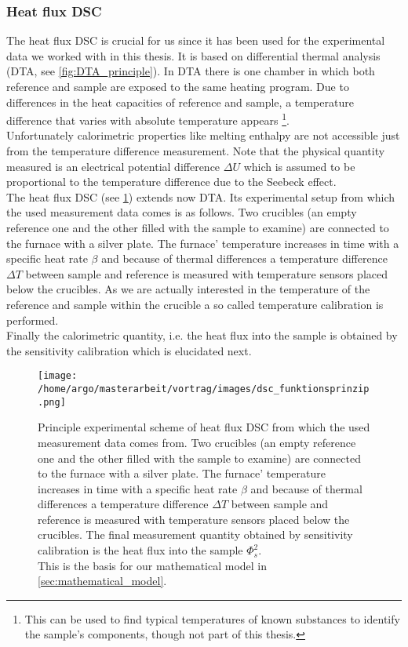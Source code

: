 \documentclass{scrartcl}[12pt, halfparskip]
\numberwithin{equation}{section}
\numberwithin{figure}{section}
\numberwithin{table}{section}
\begin{document}
\subsubsection{Heat flux DSC}
\label{sec:heat_flux_dsc}
The heat flux DSC is crucial for us since it has been used for the experimental data we worked with in this thesis. It is based on differential thermal analysis (DTA, see \cref{fig:DTA_principle}). 
In DTA there is one chamber in which both reference and sample are exposed to the same heating program.
Due to differences in the heat capacities of reference and sample, a temperature difference that varies with absolute temperature appears \footnote{This can be used to find typical temperatures of known substances to identify the sample's components, though not part of this thesis.}. \\
Unfortunately calorimetric properties like melting enthalpy are not accessible just from the temperature difference measurement. 
Note that the physical quantity measured is an electrical potential difference $\Delta U$ which is assumed to be proportional to the temperature difference due to the Seebeck effect. \\
The heat flux DSC (see \cref{fig:heat_flux_DSC}) extends now DTA. Its experimental setup from which the used measurement data comes is as follows. Two crucibles (an empty reference one and the other filled with the sample to examine) are connected to the furnace with a silver plate. The furnace' temperature increases in time with a specific heat rate $\beta$ and because of thermal differences a temperature difference $\Delta T$ between sample and reference is measured with temperature sensors placed below the crucibles. As we are actually interested in the temperature of the reference and sample within the crucible a so called temperature calibration is performed. \\
Finally the calorimetric quantity, i.e. the heat flux into the sample is obtained by the sensitivity calibration which is elucidated next.


\begin{figure}[H]
	\centering
	\texttt{[image: /home/argo/masterarbeit/vortrag/images/dsc\_funktionsprinzip.png]}
	\caption{Principle experimental scheme of heat flux DSC from which the used measurement data comes from. Two crucibles (an empty reference one and the other filled with the sample to examine) are connected to the furnace with a silver plate. The furnace' temperature increases in time with a specific heat rate $\beta$ and because of thermal differences a temperature difference $\Delta T$ between sample and reference is measured with temperature sensors placed below the crucibles. The final measurement quantity obtained by sensitivity calibration is the heat flux into the sample $\varPhi_s^2$. \\
	This is the basis for our mathematical model in \cref{sec:mathematical_model}.}
	\label{fig:heat_flux_DSC}
\end{figure}
\end{document}
